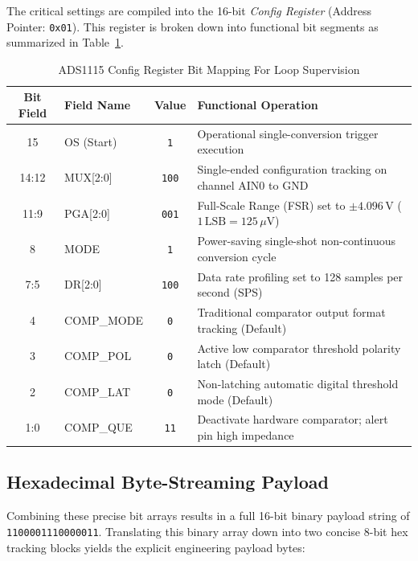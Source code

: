 The critical settings are compiled into the 16-bit \textit{Config Register} (Address Pointer: \texttt{0x01}). This register is broken down into functional bit segments as summarized in Table~\ref{tab:ads1115_bits}.

\begin{table}[htbp]
    \centering
    \footnotesize
    \caption{ADS1115 Config Register Bit Mapping For Loop Supervision}
    \label{tab:ads1115_bits}
    \setlength{\tabcolsep}{4pt}
    \begin{tabular}{c p{1.6cm} c p{2.8cm}}
        \toprule
        \textbf{Bit Field} & \textbf{Field Name} & \textbf{Value} & \textbf{Functional Operation} \\
        \midrule
        15 & OS (Start) & \texttt{1} & Operational single-conversion trigger execution \\
        14:12 & MUX[2:0] & \texttt{100} & Single-ended configuration tracking on channel AIN0 to GND \\
        11:9 & PGA[2:0] & \texttt{001} & Full-Scale Range (FSR) set to $\pm4.096\,\text{V}$ ($1\,\text{LSB} = 125\,\mu\text{V}$) \\
        8 & MODE & \texttt{1} & Power-saving single-shot non-continuous conversion cycle \\
        7:5 & DR[2:0] & \texttt{100} & Data rate profiling set to 128 samples per second (SPS) \\
        4 & COMP\_MODE & \texttt{0} & Traditional comparator output format tracking (Default) \\
        3 & COMP\_POL & \texttt{0} & Active low comparator threshold polarity latch (Default) \\
        2 & COMP\_LAT & \texttt{0} & Non-latching automatic digital threshold mode (Default) \\
        1:0 & COMP\_QUE & \texttt{11} & Deactivate hardware comparator; alert pin high impedance \\
        \bottomrule
    \end{tabular}
\end{table}

\subsection{Hexadecimal Byte-Streaming Payload}
Combining these precise bit arrays results in a full 16-bit binary payload string of \texttt{1100001110000011}. Translating this binary array down into two concise 8-bit hex tracking blocks yields the explicit engineering payload bytes:


